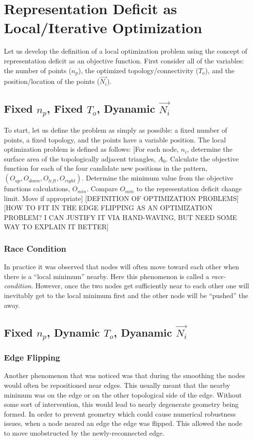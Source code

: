 \documentclass[11pt]{article}
\begin{document}
\section{Representation Deficit as Local/Iterative Optimization}
Let us develop the definition of a local optimization problem using the
concept of representation deficit as an objective function. First
consider all of the variables: the number of points ($n_p$), the
optimized topology/connectivity ($T_o$), and the position/location of
the points ($\vec{N_i}$).
\subsection{Fixed $n_p$, Fixed $T_o$, Dyanamic $\vec{N_i}$}
To start, let us define the problem as simply as possible: a fixed
number of points, a fixed topology, and the points have a variable
position.  The local optimization problem is defined as follows: [For
each node, $n_i$, determine the surface area of the topologically
adjacent triangles, $A_0$. Calculate the objective function for each of
the four candidate new positions in the pattern, $\left(O_{up},
O_{down}, O_{left}, O_{right}\right)$. Determine the minimum value from
the objective functions calculations, $O_{min}$. Compare $O_{min}$ to
the representation deficit change limit. Move if appropriate]
[DEFINITION OF OPTIMIZATION PROBLEMS]
[HOW TO FIT IN THE EDGE FLIPPING AS AN OPTIMIZATION PROBLEM? I CAN
JUSTIFY IT VIA HAND-WAVING, BUT NEED SOME WAY TO EXPLAIN IT BETTER]
\subsubsection{Race Condition}
In practice it was observed that nodes will often move toward each other
when there is a ``local minimum'' nearby. Here this phenomenon is called
a {\it race-condition}. However, once the two nodes get sufficiently
near to each other one will inevitably get to the local minimum first
and the other node will be ``pushed'' the away.
\subsection{Fixed $n_p$, Dynamic $T_o$, Dyanamic $\vec{N_i}$}
\subsubsection{Edge Flipping}
Another phenomenon that was noticed was that during the smoothing the
nodes would often be repositioned near edges. This usually meant that
the nearby minimum was on the edge or on the other topological side of
the edge. Without some sort of intervention, this would lead to nearly
degenerate geometry being formed. In order to prevent geometry which
could cause numerical robustness issues, when a node neared an edge the
edge was flipped. This allowed the node to move unobstructed by the
newly-reconnected edge.
\end{document}
